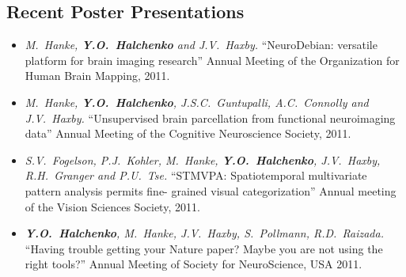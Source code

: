 \documentclass[12pt,overlapped,line]{res}
\newcommand{\mtitle}[1]{``#1''}
\newcommand{\mauthors}[1]{ \textit{#1.}}
\newcommand{\mwhere}[1]{#1.}
\begin{document}
\begin{resume}
\section{Recent Poster Presentations }

\begin{itemize}
 \item
   \mauthors{M.~Hanke, \textbf{Y.O.~Halchenko} and J.V.~Haxby}
   \mtitle{NeuroDebian: versatile platform for brain imaging research}
   \mwhere{Annual Meeting of the Organization for Human Brain Mapping, 2011}

 \item
   \mauthors{M.~Hanke, \textbf{Y.O.~Halchenko}, J.S.C.~Guntupalli,
     A.C.~Connolly and J.V.~Haxby}
   \mtitle{Unsupervised brain parcellation from functional neuroimaging data}
   \mwhere{Annual Meeting of the Cognitive Neuroscience Society, 2011}

 \item
   \mauthors{S.V.~Fogelson, P.J.~Kohler, M.~Hanke, \textbf{Y.O.~Halchenko}, J.V.~Haxby,
     R.H.~Granger and P.U.~Tse}
   \mtitle{STMVPA: Spatiotemporal
     multivariate pattern analysis permits fine- grained visual
     categorization}
   \mwhere{Annual meeting of the Vision Sciences Society, 2011}

 \item
   \mauthors{\textbf{Y.O.~Halchenko}, M.~Hanke, J.V.~Haxby,
     S.~Pollmann, R.D.~Raizada}
   \mtitle{Having trouble getting your Nature paper? Maybe you are not
     using the right tools?}
   \mwhere{Annual Meeting of Society for NeuroScience, USA 2011}

% 
% 


\end{itemize}
\end{resume}
\end{document}
